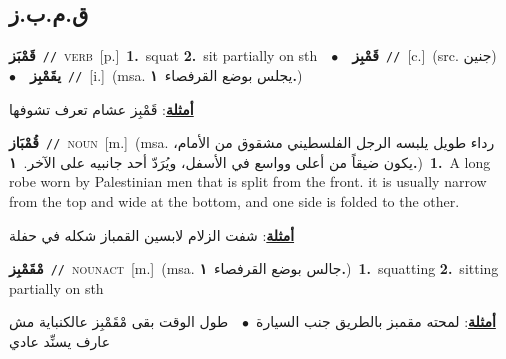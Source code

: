 \documentclass[10pt,a4paper,twoside]{article} %
\begin{document}
\begin{multicols}{2}
\vspace{-3mm}
\subsection*{\color{blue}\foreignlanguage{arabic}{ق.م.ب.ز}\color{blue}{}} 

{\setlength\topsep{0pt}\textbf{\foreignlanguage{arabic}{قَمْبَز}}\ {\color{gray}\texttt{//}\color{black}}\ \textsc{verb}\ [p.]\ \textbf{1.}~squat  \textbf{2.}~sit partially on sth\ \ $\bullet$\ \ \setlength\topsep{0pt}\textbf{\foreignlanguage{arabic}{قَمْبِز}}\ {\color{gray}\texttt{//}\color{black}}\ [c.]\ (src. \color{gray}\foreignlanguage{arabic}{جنين}\color{black})\ \ $\bullet$\ \ \setlength\topsep{0pt}\textbf{\foreignlanguage{arabic}{يقَمْبِز}}\ {\color{gray}\texttt{//}\color{black}}\ [i.]\ \color{gray}(msa. \foreignlanguage{arabic}{يجلس بوضع القرفصاء}~\foreignlanguage{arabic}{\textbf{١.}})\color{black}\  \begin{flushright}\color{gray}\foreignlanguage{arabic}{\textbf{\underline{\foreignlanguage{arabic}{أمثلة}}}: قَمْبِز عشام تعرف تشوفها}\end{flushright}\color{black}} \vspace{2mm}

{\setlength\topsep{0pt}\textbf{\foreignlanguage{arabic}{قُمْبَاز}}\ {\color{gray}\texttt{//}\color{black}}\ \textsc{noun}\ [m.]\ \color{gray}(msa. \foreignlanguage{arabic}{رداء طويل يلبسه الرجل الفلسطيني مشقوق من الأمام، يكون ضيقاً من أعلى وواسع في الأسفل، ويُرَدّ أحد جانبيه على الآخر.}~\foreignlanguage{arabic}{\textbf{١.}})\color{black}\ \textbf{1.}~A long robe worn by Palestinian men that is split from the front. it is usually narrow from the top and wide at the bottom, and one side is folded to the other.\  \begin{flushright}\color{gray}\foreignlanguage{arabic}{\textbf{\underline{\foreignlanguage{arabic}{أمثلة}}}: شفت الزلام لابسين القمباز شكله في حفلة}\end{flushright}\color{black}} \vspace{2mm}

{\setlength\topsep{0pt}\textbf{\foreignlanguage{arabic}{مْقَمْبِز}}\ {\color{gray}\texttt{//}\color{black}}\ \textsc{noun\textunderscore act}\ [m.]\ \color{gray}(msa. \foreignlanguage{arabic}{جالس بوضع القرفصاء}~\foreignlanguage{arabic}{\textbf{١.}})\color{black}\ \textbf{1.}~squatting  \textbf{2.}~sitting partially on sth\  \begin{flushright}\color{gray}\foreignlanguage{arabic}{\textbf{\underline{\foreignlanguage{arabic}{أمثلة}}}: لمحته مقمبز بالطريق جنب السيارة\ $\bullet$\ \  طول الوقت بقى مْقَمْبِز عالكنباية مش عارف يسنِّد عادي}\end{flushright}\color{black}} \vspace{2mm}


\end{multicols}
\end{document}
